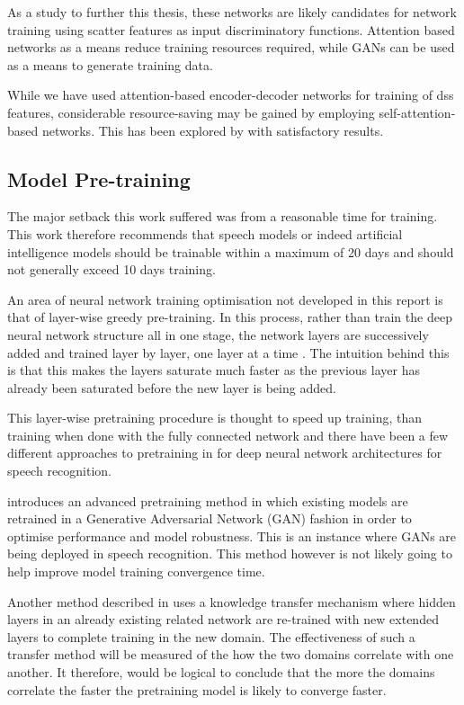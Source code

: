 {As a study to further this thesis, these networks are likely candidates for network training using scatter features as input discriminatory functions.  Attention based networks as a means reduce training resources required, while GANs can be used as a means to generate training data.

While we have used attention-based encoder-decoder networks for training of \acrshort{dss} features, considerable resource-saving may be gained by employing self-attention-based networks.  This has been explored by  \cite{salazar2019self} with satisfactory results.

\subsection{Model Pre-training}
The major setback this work suffered was from a reasonable time for training.  This work therefore recommends that speech models or indeed artificial intelligence models should be trainable within a maximum of 20 days and should not generally exceed 10 days training.

An area of neural network training optimisation not developed in this report is that of layer-wise greedy pre-training.  In this process, rather than train the deep neural network structure all in one stage, the network layers are successively added and trained layer by layer, one layer at a time \citep{Goodfellow-et-al-2016}.  The intuition behind this is that this makes the layers saturate much faster as the previous layer has already been saturated before the new layer is being added.

This layer-wise pretraining procedure is thought to speed up training, than training when done with the fully connected network and there have been a few different approaches to pretraining in for deep neural network architectures for speech recognition. 

\cite{hendrycks2019using} introduces an advanced pretraining method in which existing models are retrained in a Generative Adversarial Network (GAN) fashion in order to optimise performance and model robustness.  This is an instance where GANs are being deployed in speech recognition.  This method however is not likely going to help improve model training convergence time.

Another method described in \citep{ramachandran2016unsupervised} uses a knowledge transfer mechanism where hidden layers in an already existing related network are re-trained with new extended layers to complete training in the new domain.  The effectiveness of such a transfer method will be measured of the how the two domains correlate with one another. It therefore, would be logical to conclude that the more the domains correlate the faster the pretraining model is likely to converge faster.

}
